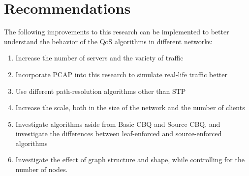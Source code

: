\section{Recommendations}
The following improvements to this research can be implemented to better understand the behavior of the QoS algorithms in different networks:
\begin{enumerate}
    \item Increase the number of servers and the variety of traffic
    \item Incorporate PCAP into this research to simulate real-life traffic better
    \item Use different path-resolution algorithms other than STP
    \item Increase the scale, both in the size of the network and the number of clients
    \item Investigate algorithms aside from Basic CBQ and Source CBQ, and investigate the differences between leaf-enforced and source-enforced algorithms
    \item Investigate the effect of graph structure and shape, while controlling for the number of nodes.
\end{enumerate}
